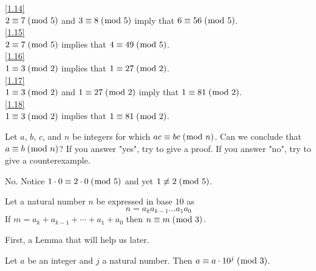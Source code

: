 \documentclass[../main.tex]{subfiles}
\begin{document}
\hspace*{5mm} \ref{1.14} \\
\hspace*{15mm} $2 \equiv 7 \; (\bmod \; 5)$ and $3 \equiv 8 \; (\bmod \; 5)$ imply that $6 \equiv 56 \; (\bmod \; 5)$. \\

\hspace*{5mm} \ref{1.15} \\
\hspace*{15mm} $2 \equiv 7 \; (\bmod \; 5)$ implies that $4 \equiv 49 \; (\bmod \; 5)$. \\

\hspace*{5mm} \ref{1.16} \\
\hspace*{15mm} $1 \equiv 3 \; (\bmod \; 2)$ implies that $1 \equiv 27 \; (\bmod \; 2)$. \\

\hspace*{5mm} \ref{1.17} \\
\hspace*{15mm} $1 \equiv 3 \; (\bmod \; 2)$ and $1 \equiv 27 \; (\bmod \; 2)$ imply that $1 \equiv 81 \; (\bmod \; 2)$. \\

\hspace*{5mm} \ref {1.18} \\
\hspace*{15mm} $1 \equiv 3 \; (\bmod \; 2)$ implies that $1 \equiv 81 \; (\bmod \; 2)$.



\begin{ques} \label{1.20}
Let $a$, $b$, $c$, and $n$ be integers for which $ac \equiv bc \; (\bmod \; n)$. Can we conclude that $a \equiv b \; (\bmod \; n)$? If you answer "yes", try to give a proof. If you answer "no", try to give a counterexample.
\end{ques}

No. Notice $1 \cdot 0 \equiv 2 \cdot 0 \; (\bmod \; 5)$ and yet $1 \not \equiv 2 \; (\bmod \; 5)$.



\begin{thm} \label{1.21}
Let a natural number $n$ be expressed in base $10$ as
$$n=a_k a_{k-1} \ldots a_1 a_0$$
If $m = a_k + a_{k-1} + \cdots + a_1 + a_0$ then $n \equiv m \; (\bmod \; 3)$.
\end{thm}

First, a Lemma that will help us later.

\begin{lem} \label{1.21 Lemma}
Let $a$ be an integer and $j$ a natural number. Then $a \equiv a \cdot 10^j \; (\bmod \; 3)$.
\end{lem}
\end{document}
